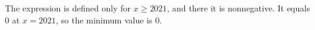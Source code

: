 The expression is defined only for $x\ge2021$, and there it is nonnegative. It equals $0$ at $x=2021$, so the minimum value is $\boxed{0}$.
